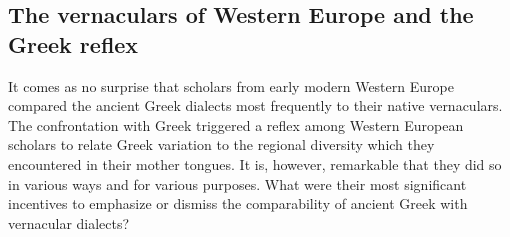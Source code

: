 \subsection{The vernaculars of Western Europe and the Greek reflex}
\hypertarget{Toc19704858}{}\begin{styleStandard}
It comes as no surprise that scholars from early modern Western Europe compared the ancient Greek dialects most frequently to their native vernaculars. The confrontation with Greek triggered a reflex among Western European scholars to relate Greek variation to the regional diversity which they encountered in their mother tongues. It is, however, remarkable that they did so in various ways and for various purposes. What were their most significant incentives to emphasize or dismiss the comparability of ancient Greek with vernacular dialects?
\end{styleStandard}

